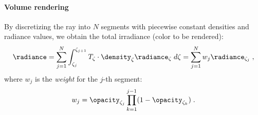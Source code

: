 \paragraph{Volume rendering}
By discretizing the ray into $N$ segments with piecewise constant densities and radiance values, we obtain the total irradiance (color to be rendered): %
\begin{equation}
    \begin{aligned}
      \radiance = \sum_{j=1}^N \int_{\zeta_j}^{\zeta_{j+1}}  T_{\zeta} \cdot \density_\zeta \radiance_\zeta \;d\zeta  
      = \sum_{j=1}^N  w_j \radiance_{\zeta_j}\;,
    \end{aligned}
    \label{eq:iccv_ vol_render_nerf}
\end{equation}
where $w_j$ is the \textit{weight} for the $j$-th segment:
\begin{equation}
    \label{eq:iccv_weights_nerf}
    w_j = \opacity_{\zeta_j}\prod_{k=1}^{j-1}(1 - \opacity_{\zeta_k})\;.
\end{equation}